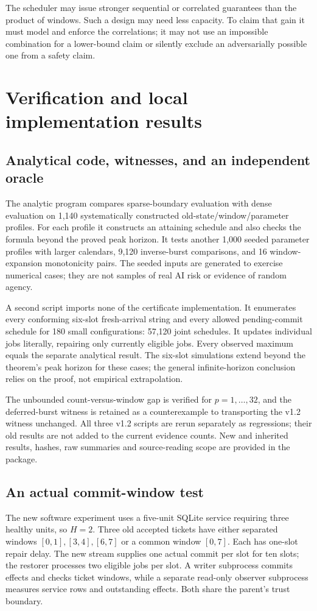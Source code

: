 \documentclass[11pt,a4paper]{article}
\theoremstyle{definition}\newtheorem{definition}{Definition}
\begin{document}
The scheduler may issue stronger sequential or correlated guarantees than the product of windows. Such a design may need less capacity. To claim that gain it must model and enforce the correlations; it may not use an impossible combination for a lower-bound claim or silently exclude an adversarially possible one from a safety claim.

\section{Verification and local implementation results}
\label{sec:results}
\subsection{Analytical code, witnesses, and an independent oracle}
The analytic program compares sparse-boundary evaluation with dense evaluation on 1,140 systematically constructed old-state/window/parameter profiles. For each profile it constructs an attaining schedule and also checks the formula beyond the proved peak horizon. It tests another 1,000 seeded parameter profiles with larger calendars, 9,120 inverse-burst comparisons, and 16 window-expansion monotonicity pairs. The seeded inputs are generated to exercise numerical cases; they are not samples of real AI risk or evidence of random agency.

A second script imports none of the certificate implementation. It enumerates every conforming six-slot fresh-arrival string and every allowed pending-commit schedule for 180 small configurations: 57,120 joint schedules. It updates individual jobs literally, repairing only currently eligible jobs. Every observed maximum equals the separate analytical result. The six-slot simulations extend beyond the theorem's peak horizon for these cases; the general infinite-horizon conclusion relies on the proof, not empirical extrapolation.

The unbounded count-versus-window gap is verified for $p=1,\ldots,32$, and the deferred-burst witness is retained as a counterexample to transporting the v1.2 witness unchanged. All three v1.2 scripts are rerun separately as regressions; their old results are not added to the current evidence counts. New and inherited results, hashes, raw summaries and source-reading scope are provided in the package.

\subsection{An actual commit-window test}
The new software experiment uses a five-unit SQLite service requiring three healthy units, so $H=2$. Three old accepted tickets have either separated windows $[0,1],[3,4],[6,7]$ or a common window $[0,7]$. Each has one-slot repair delay. The new stream supplies one actual commit per slot for ten slots; the restorer processes two eligible jobs per slot. A writer subprocess commits effects and checks ticket windows, while a separate read-only observer subprocess measures service rows and outstanding effects. Both share the parent's trust boundary.
\end{document}
